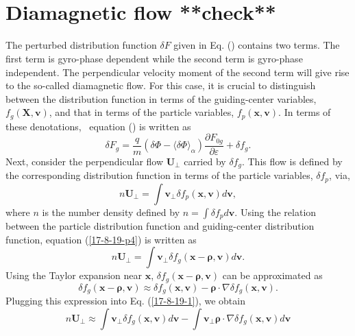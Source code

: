 \documentclass{article}
\newcommand{\tmmathbf}[1]{\ensuremath{\boldsymbol{#1}}}
\begin{document}
\

\

\section{Diamagnetic flow **check**}\label{17-9-26-1}\label{17-8-19-e1}

The perturbed distribution function $\delta F$ given in Eq. () contains two
terms. The first term is gyro-phase dependent while the second term is
gyro-phase independent. The perpendicular velocity moment of the second term
will give rise to the so-called diamagnetic flow. For this case, it is crucial
to distinguish between the distribution function in terms of the
guiding-center variables, $f_g (\mathbf{X}, \mathbf{v})$, and that in terms of
the particle variables, $f_p (\mathbf{x}, \mathbf{v})$. In terms of these
denotations, \ equation () is written as
\begin{equation}
  \delta F_g = \frac{q}{m} (\delta \Phi - \langle \delta \Phi
  \rangle_{\alpha}) \frac{\partial F_{0 g}}{\partial \varepsilon} + \delta f_g
  .
\end{equation}
Next, consider the perpendicular flow $\mathbf{U}_{\perp}$ carried by $\delta
f_g$. This flow is defined by the corresponding distribution function in terms
of the particle variables, $\delta f_p$, via,
\begin{equation}
  \label{17-8-19-p4} n\mathbf{U}_{\perp} = \int \mathbf{v}_{\perp} \delta f_p
  (\mathbf{x}, \mathbf{v}) d\mathbf{v},
\end{equation}
where $n$ is the number density defined by $n = \int \delta f_p d\mathbf{v}$.
Using the relation between the particle distribution function and
guiding-center distribution function, equation (\ref{17-8-19-p4}) is written
as
\begin{equation}
  \label{17-8-19-1} n\mathbf{U}_{\perp} = \int \mathbf{v}_{\perp} \delta f_g
  (\mathbf{x}-\tmmathbf{\rho}, \mathbf{v}) d\mathbf{v}.
\end{equation}
Using the Taylor expansion near $\mathbf{x}$, $\delta f_g
(\mathbf{x}-\tmmathbf{\rho}, \mathbf{v})$ can be approximated as
\begin{equation}
  \delta f_g (\mathbf{x}-\tmmathbf{\rho}, \mathbf{v}) \approx \delta f_g
  (\mathbf{x}, \mathbf{v}) -\tmmathbf{\rho} \cdot \nabla \delta f_g
  (\mathbf{x}, \mathbf{v}) .
\end{equation}
Plugging this expression into Eq. (\ref{17-8-19-1}), we obtain
\begin{equation}
  \label{17-8-19-3} n\mathbf{U}_{\perp} \approx \int \mathbf{v}_{\perp} \delta
  f_g (\mathbf{x}, \mathbf{v}) d\mathbf{v}- \int \mathbf{v}_{\perp}
  \tmmathbf{\rho} \cdot \nabla \delta f_g (\mathbf{x}, \mathbf{v}) d\mathbf{v}
\end{equation}
\end{document}
